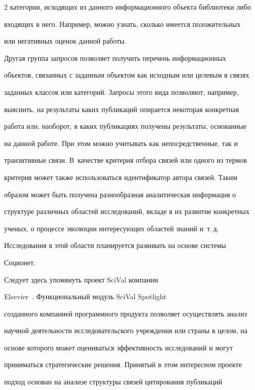 \begin{multicols}{2}
категории, исходящих из данного информационного объекта библиотеки либо 


входящих в него. Например, можно узнать, сколько имеется положительных 


или негативных оценок данной работы. 


  


  Другая группа запросов позволяет получить перечень информационных 


объектов, связанных с заданным объектом как исходным или целевым в связях 


заданных классов или категорий. Запросы этого вида позволяют, например, 


выяснить, на результаты каких публикаций опирается некоторая конкретная 


работа или, наоборот, в каких публикациях получены результаты, основанные 


на данной работе. При этом можно учитывать как непосредственные, так и 


транзитивные связи. В~качестве критерия отбора связей или одного из термов 


критерия может также использоваться идентификатор автора связей. Таким 


образом может быть получена разнообразная аналитическая информация о 


структуре различных областей исследований, вкладе в их развитие конкретных 


ученых, о процессе эволюции интересующих областей знаний и~т.\,д. 


Исследования в этой области планируется развивать на основе системы 


Соционет. 


  


  Следует здесь упомянуть проект {SciVal} компании 


{Elsevier}~\cite{28-kog}. Функциональный модуль {SciVal Spotlight} 


созданного компанией программного продукта позволяет осуществлять анализ 


научной деятельности исследовательского учреждения или страны в целом, на 


основе которого может оцениваться эффективность исследований и могут 


приниматься стратегические решения. Принятый в этом интересном проекте 


подход основан на анализе структуры связей цитирования публикаций 



\end{multicols}
